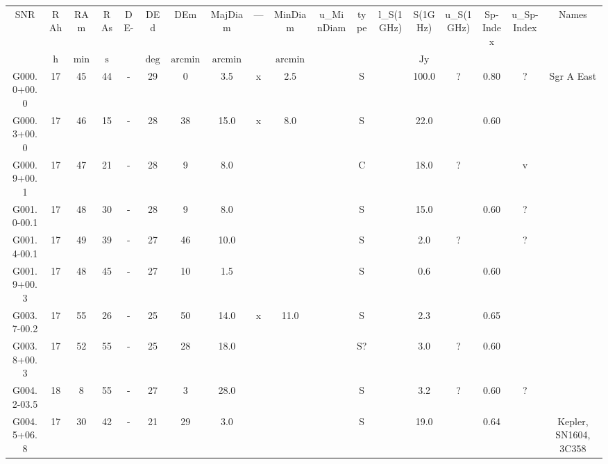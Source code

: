 \begin{table}
\begin{tabular}{cccccccccccccccccc}
SNR & RAh & RAm & RAs & DE- & DEd & DEm & MajDiam & --- & MinDiam & u_MinDiam & type & l_S(1GHz) & S(1GHz) & u_S(1GHz) & Sp-Index & u_Sp-Index & Names \\
 & $\mathrm{h}$ & $\mathrm{min}$ & $\mathrm{s}$ &  & $\mathrm{deg}$ & $\mathrm{arcmin}$ & $\mathrm{arcmin}$ &  & $\mathrm{arcmin}$ &  &  &  & $\mathrm{Jy}$ &  &  &  &  \\
G000.0+00.0 & 17 & 45 & 44 & - & 29 & 0 & 3.5 & x & 2.5 &  & S &  & 100.0 & ? & 0.80 & ? & Sgr A East \\
G000.3+00.0 & 17 & 46 & 15 & - & 28 & 38 & 15.0 & x & 8.0 &  & S &  & 22.0 &  & 0.60 &  &  \\
G000.9+00.1 & 17 & 47 & 21 & - & 28 & 9 & 8.0 &  &  &  & C &  & 18.0 & ? &  & v &  \\
G001.0-00.1 & 17 & 48 & 30 & - & 28 & 9 & 8.0 &  &  &  & S &  & 15.0 &  & 0.60 & ? &  \\
G001.4-00.1 & 17 & 49 & 39 & - & 27 & 46 & 10.0 &  &  &  & S &  & 2.0 & ? &  & ? &  \\
G001.9+00.3 & 17 & 48 & 45 & - & 27 & 10 & 1.5 &  &  &  & S &  & 0.6 &  & 0.60 &  &  \\
G003.7-00.2 & 17 & 55 & 26 & - & 25 & 50 & 14.0 & x & 11.0 &  & S &  & 2.3 &  & 0.65 &  &  \\
G003.8+00.3 & 17 & 52 & 55 & - & 25 & 28 & 18.0 &  &  &  & S? &  & 3.0 & ? & 0.60 &  &  \\
G004.2-03.5 & 18 & 8 & 55 & - & 27 & 3 & 28.0 &  &  &  & S &  & 3.2 & ? & 0.60 & ? &  \\
G004.5+06.8 & 17 & 30 & 42 & - & 21 & 29 & 3.0 &  &  &  & S &  & 19.0 &  & 0.64 &  & Kepler, SN1604, 3C358 \\
\end{tabular}
\end{table}
